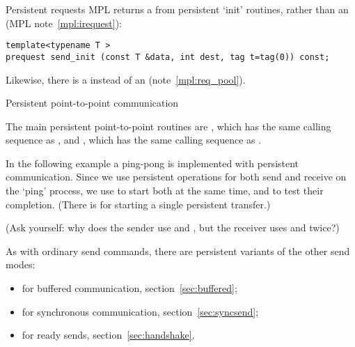 \begin{mplnote}{Persistent requests}
  MPL returns a 
  from persistent `init' routines, rather than an 
  (MPL note~\ref{mpl:irequest}):
\begin{lstlisting}
template<typename T >
prequest send_init (const T &data, int dest, tag t=tag(0)) const;
\end{lstlisting}
Likewise, there is a 
instead of an  (note~\ref{mpl:req_pool}).
\end{mplnote}

 {Persistent point-to-point communication}
\label{sec:persist-p2p}

The main persistent point-to-point routines are
, which has the same calling sequence as
, and , which has the same
calling sequence as .
  
In the following example a ping-pong is implemented with persistent communication.
Since we use persistent operations for both send and receive on the `ping' process,
we use  to start both at the same time,
and  to test their completion.
(There is  for starting a single persistent transfer.)
%  
{
  \def\snippetcodefraction{.45}
  \def\snippetlistfraction{.5}  
}

(Ask yourself: why does the sender use  and ,
but the receiver uses  and 
twice?)


As with ordinary send commands, there are persistent variants
of the other send modes:
\begin{itemize}
\item
   for buffered communication,
  section~\ref{sec:buffered};
\item
   for synchronous communication,
  section~\ref{sec:syncsend};
\item
   for ready sends,
  section~\ref{sec:handshake}.
\end{itemize}


